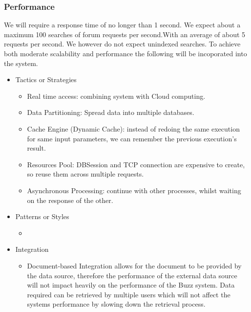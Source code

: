 \subsubsection{Performance}
		We will require a response time of no longer than 1 second. We expect about a maximum 100 searches of forum requests per second.With an average of about 5 requests per second. We however do not expect unindexed searches. To achieve both moderate scalability and performance the following will be incoporated into the system.
		\begin{itemize}
	\item{Tactics or Strategies}
		\begin{itemize}
			\item Real time access: combining system with Cloud computing.
			\item Data Partitioning: Spread data into multiple databases.
			\item Cache Engine (Dynamic Cache): instead of redoing the same execution for same input parameters, we can remember the previous execution's result.
			\item Resources Pool: DBSession and TCP connection are expensive to create, so reuse them across multiple requests.
			\item Asynchronous Processing: continue with other processes, whilst waiting on the response of the other.
		\end{itemize}
	\item{Patterns or Styles}
		\begin{itemize}
			\item
		\end{itemize}
	\item{Integration}
		\begin{itemize}
			\item Document-based Integration allows for the document to be provided by the data source, therefore the performance of the external data source will not impact heavily on the performance of the Buzz system. Data required can be retrieved by multiple users which will not affect the systems performance by slowing down the retrieval process. 
		\end{itemize}
\end{itemize}

